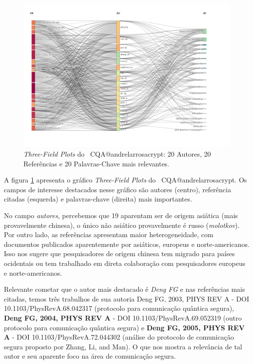 \begin{figure}
    \centering
    \includegraphics[angle=0,width=1\textwidth]{experiments/andrelarrosacrypt/AnaliseBibliometrica/CriptografiaQuantica/imagens/CQA@andrelarrosacrypt_Aut_Ref_Key.png}
    \caption{\textit{Three-Field Plots} do \dataset\ CQA@andrelarrosacrypt: 20 Autores, 20 Referências e 20 Palavras-Chave mais relevantes.}
    \label{CQA@andrelarrosacrypt_Aut_Ref_Key}
\end{figure}

A figura \ref{CQA@andrelarrosacrypt_Aut_Ref_Key} apresenta o gráfico \textit{Three-Field Plots} do  \dataset\ CQA@andrelarrosacrypt. Os campos de interesse destacados nesse gráfico são autores (centro), referência citadas (esquerda) e palavras-chave (direita) mais importantes.

No campo \textit{autores}, percebemos que 19 aparentam ser de origem asiática (mais provavelmente chinesa), o único não asiático provavelmente é russo (\textit{molotkov}). Por outro lado, as referências apresentam maior heterogeneidade, com documentos publicados aparentemente por asiáticos, europeus e norte-americanos. Isso nos sugere que pesquisadores de origem chinesa tem migrado para países ocidentais ou tem trabalhado em direta colaboração com pesquisadores europeus e norte-americanos.

Relevante cometar que o autor mais destacado é \textit{Deng FG} e nas referências mais citadas, temos três trabalhos de sua autoria \textbf{}{Deng FG, 2003, PHYS REV A} - DOI 10.1103/PhysRevA.68.042317 (protocolo para comunicação quântica segura), \textbf{Deng FG, 2004, PHYS REV A} - DOI 10.1103/PhysRevA.69.052319 (outro protocolo para comunicação quântica segura) e \textbf{Deng FG, 2005, PHYS REV A} - DOI 10.1103/PhysRevA.72.044302 (análise do protocolo de comunicação segura proposto por Zhang, Li, and Man). O que nos mostra a relevância de tal autor e seu aparente foco na área de comunicação segura.

